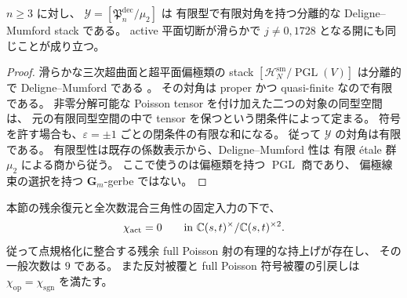 \begin{lemma}
\label{lem:nfm-poisson-target-finite-diagonal}
$n\ge3$ に対し、
$\mathcal Y=[\mathfrak P_n^{\mathrm{dec}}/\mu_2]$ は
有限型で有限対角を持つ分離的な Deligne--Mumford stack である。
active 平面切断が滑らかで $j\ne0,1728$ となる開にも同じことが成り立つ。
\end{lemma}
\begin{proof}
滑らかな三次超曲面と超平面偏極類の stack
$[\mathcal H_N^{\mathrm{sm}}/\operatorname{PGL}(V)]$ は分離的で
Deligne--Mumford である
\cite[Theorems~1.6 and~1.7]{NFMBenoistSeparation}。
その対角は proper かつ quasi-finite なので有限である。
非零分解可能な Poisson tensor を付け加えた二つの対象の同型空間は、
元の有限同型空間の中で tensor を保つという閉条件によって定まる。
符号を許す場合も、$\varepsilon=\pm1$ ごとの閉条件の有限な和になる。
従って $\mathcal Y$ の対角は有限である。
有限型性は既存の係数表示から、Deligne--Mumford 性は
有限 \'etale 群 $\mu_2$ による商から従う。
ここで使うのは偏極類を持つ $\operatorname{PGL}$ 商であり、
偏極線束の選択を持つ $\mathbf G_m$-gerbe ではない。
\end{proof}

\begin{theorem}
\label{thm:nfm-active-sign-vanishing}
本節の残余復元と全次数混合三角性の固定入力の下で、
\[
 \chi_{\mathrm{act}}=0
 \qquad\text{in }\mathbb C(s,t)^\times/\mathbb C(s,t)^{\times2}.
\]
従って点規格化に整合する残余 full Poisson 射の有理的な持上げが存在し、
その一般次数は $9$ である。
また反対被覆と full Poisson 符号被覆の引戻しは
$\chi_{\mathrm{op}}=\chi_{\mathrm{sgn}}$ を満たす。
\end{theorem}

